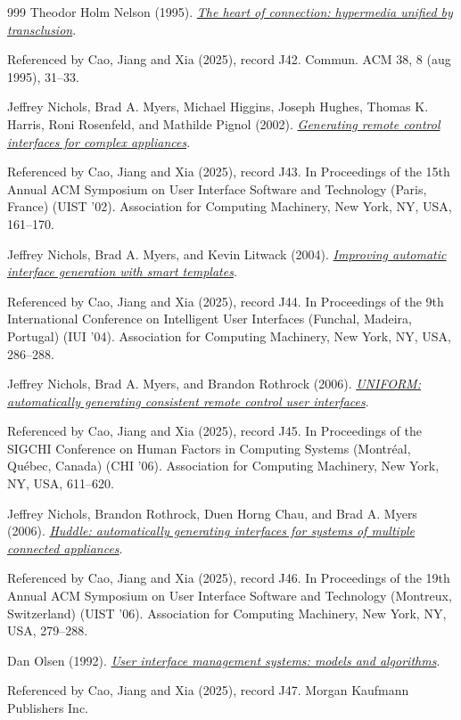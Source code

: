 \documentclass[11pt,letterpaper]{article}
\begin{document}
\begin{thebibliography}{999}
Theodor Holm Nelson (1995).
\href{https://doi.org/10.1145/208344.208353}{\emph{The heart of connection: hypermedia unified by transclusion}}.
\par {\small Referenced by Cao, Jiang and Xia (2025), record J42. Commun. ACM 38, 8 (aug 1995), 31–33.}

Jeffrey Nichols, Brad A. Myers, Michael Higgins, Joseph Hughes, Thomas K. Harris, Roni Rosenfeld, and Mathilde Pignol (2002).
\href{https://doi.org/10.1145/571985.572008}{\emph{Generating remote control interfaces for complex appliances}}.
\par {\small Referenced by Cao, Jiang and Xia (2025), record J43. In Proceedings of the 15th Annual ACM Symposium on User Interface Software and Technology (Paris, France) (UIST ’02). Association for Computing Machinery, New York, NY, USA, 161–170.}

Jeffrey Nichols, Brad A. Myers, and Kevin Litwack (2004).
\href{https://doi.org/10.1145/964442.964507}{\emph{Improving automatic interface generation with smart templates}}.
\par {\small Referenced by Cao, Jiang and Xia (2025), record J44. In Proceedings of the 9th International Conference on Intelligent User Interfaces (Funchal, Madeira, Portugal) (IUI ’04). Association for Computing Machinery, New York, NY, USA, 286–288.}

Jeffrey Nichols, Brad A. Myers, and Brandon Rothrock (2006).
\href{https://doi.org/10.1145/1124772.1124865}{\emph{UNIFORM: automatically generating consistent remote control user interfaces}}.
\par {\small Referenced by Cao, Jiang and Xia (2025), record J45. In Proceedings of the SIGCHI Conference on Human Factors in Computing Systems (Montréal, Québec, Canada) (CHI ’06). Association for Computing Machinery, New York, NY, USA, 611–620.}

Jeffrey Nichols, Brandon Rothrock, Duen Horng Chau, and Brad A. Myers (2006).
\href{https://www.cs.cmu.edu/~jeffreyn/huddle/}{\emph{Huddle: automatically generating interfaces for systems of multiple connected appliances}}.
\par {\small Referenced by Cao, Jiang and Xia (2025), record J46. In Proceedings of the 19th Annual ACM Symposium on User Interface Software and Technology (Montreux, Switzerland) (UIST ’06). Association for Computing Machinery, New York, NY, USA, 279–288.}

Dan Olsen (1992).
\href{https://arxiv.org/html/2503.04084v1\#bib.bib48}{\emph{User interface management systems: models and algorithms}}.
\par {\small Referenced by Cao, Jiang and Xia (2025), record J47. Morgan Kaufmann Publishers Inc.}


\end{thebibliography}
\end{document}

